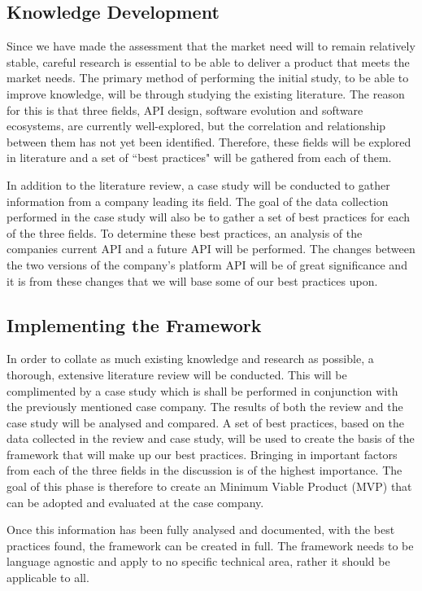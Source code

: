 \documentclass{article}
\begin{document}
\subsection{Knowledge Development}
Since we have made the assessment that the market need will to remain relatively stable, careful research is essential to be able to deliver a product that meets the market needs. The primary method of performing the initial study, to be able to improve knowledge, will be through studying the existing literature. The reason for this is that three fields, API design, software evolution and software ecosystems, are currently well-explored, but the correlation and relationship between them has not yet been identified. Therefore, these fields will be explored in literature and a set of ``best practices" will be gathered from each of them. \smallskip

In addition to the literature review, a case study will be conducted to gather information from a company leading its field. The goal of the data collection performed in the case study will also be to gather a set of best practices for each of the three fields. To determine these best practices, an analysis of the companies current API and a future API will be performed. The changes between the two versions of the company's platform API will be of great significance and it is from these changes that we will base some of our best practices upon. \smallskip

\subsection{Implementing the Framework}
In order to collate as much existing knowledge and research as possible, a thorough, extensive literature review will be conducted. This will be complimented by a case study which is shall be performed in conjunction with the previously mentioned case company. The results of both the review and the case study will be analysed and compared. A set of best practices, based on the data collected in the review and case study, will be used to create the basis of the framework that will make up our best practices. Bringing in important factors from each of the three fields in the discussion is of the highest importance. The goal of this phase is therefore to create an Minimum Viable Product (MVP) that can be adopted and evaluated at the case company. \smallskip

Once this information has been fully analysed and documented, with the best practices found, the framework can be created in full. The framework needs to be language agnostic and apply to no specific technical area, rather it should be applicable to all.
\end{document}

